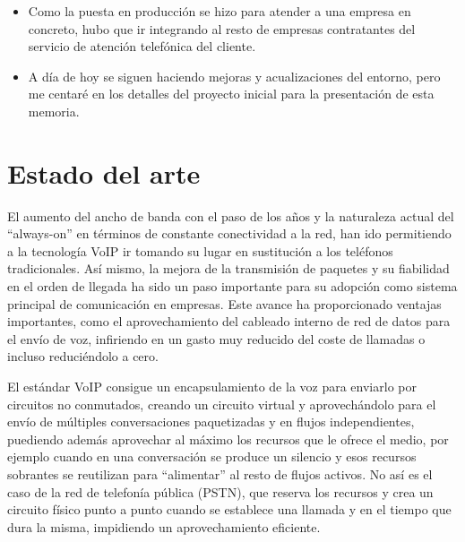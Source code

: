 \documentclass[a4paper, 12pt]{book}
\begin{document}
\begin{itemize}
  \item Como la puesta en producción se hizo para atender a una empresa en concreto, hubo que ir integrando al resto de empresas contratantes del servicio de atención telefónica del cliente.
  
  \item A día de hoy se siguen haciendo mejoras y acualizaciones del entorno, pero me centaré en los detalles del proyecto inicial para la presentación de esta memoria.
\end{itemize}




\cleardoublepage
\chapter{Estado del arte}
\label{chap:estado}

El aumento del ancho de banda con el paso de los años y la naturaleza actual del ``always-on'' en términos de constante conectividad a la red, han ido permitiendo a la tecnología VoIP ir tomando su lugar en sustitución a los teléfonos tradicionales. Así mismo, la mejora de la transmisión de paquetes y su fiabilidad en el orden de llegada ha sido un paso importante para su adopción como sistema principal de comunicación en empresas. Este avance ha proporcionado ventajas importantes, como el aprovechamiento del cableado interno de red de datos para el envío de voz, infiriendo en un gasto muy reducido del coste de llamadas o incluso reduciéndolo a cero.

El estándar VoIP consigue un encapsulamiento de la voz para enviarlo por circuitos no conmutados, creando un circuito virtual y aprovechándolo para el envío de múltiples conversaciones paquetizadas y en flujos independientes, puediendo además aprovechar al máximo los recursos que le ofrece el medio, por ejemplo cuando en una conversación se produce un silencio y esos recursos sobrantes se reutilizan para ``alimentar'' al resto de flujos activos. 
No así es el caso de la red de telefonía pública (PSTN), que reserva los recursos y crea un circuito físico punto a punto cuando se establece una llamada y en el tiempo que dura la misma, impidiendo un aprovechamiento eficiente.
\end{document}
